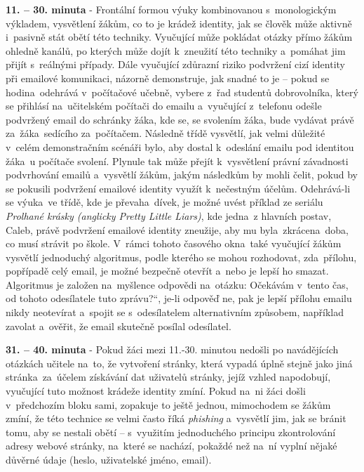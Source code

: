 \documentclass[a4paper, 12pt]{article}
\providecommand{\uv}[1]{\quotedblbase #1\textquotedblleft}
\begin{document}
\textbf{11. -- 30. minuta} - Frontální formou výuky kombinovanou s~monologickým výkladem, vysvětlení žákům, co to je krádež identity, jak se člověk může aktivně i~pasivně stát obětí této techniky. Vyučující může pokládat otázky přímo žákům ohledně kanálů, po kterých může dojít k~zneužití této techniky a~pomáhat jim přijít s~reálnými případy. Dále vyučující zdůrazní riziko podvržení cizí identity při emailové komunikaci, názorně demonstruje, jak snadné to je -- pokud se hodina~odehrává v~počítačové učebně, vybere z~řad studentů dobrovolníka, který se přihlásí na~učitelském počítači do emailu a~vyučující z~telefonu odešle podvržený email do schránky žáka, kde se, se svolením žáka, bude vydávat právě za~žáka~sedícího za~počítačem. Následně třídě vysvětlí, jak velmi důležité v~celém demonstračním scénáři bylo, aby dostal k~odeslání emailu pod identitou žáka~u počítače svolení. Plynule tak může přejít k~vysvětlení právní závadnosti podvrhování emailů a~vysvětlí žákům, jakým následkům by mohli čelit, pokud by se pokusili podvržení emailové identity využít k~nečestným účelům. Odehrává-li se výuka~ve třídě, kde je převaha~dívek, je možné uvést příklad ze seriálu \textit{Prolhané krásky (anglicky Pretty Little Liars)}, kde jedna~z hlavních postav, Caleb, právě podvržení emailové identity zneužije, aby mu byla~zkrácena~doba, co musí strávit po škole. V~rámci tohoto časového okna~také vyučující žákům vysvětlí jednoduchý algoritmus, podle kterého se mohou rozhodovat, zda~přílohu, popřípadě celý email, je možné bezpečně otevřít a~nebo je lepší ho smazat. Algoritmus je založen na~myšlence odpovědi na~otázku: \uv{Očekávám v~tento čas, od tohoto odesílatele tuto zprávu?}, je-li odpověď ne, pak je lepší přílohu emailu nikdy neotevírat a~spojit se s~odesílatelem alternativním způsobem, například zavolat a~ověřit, že email skutečně posílal odesílatel.

\textbf{31. -- 40. minuta} - Pokud žáci mezi 11.-30. minutou nedošli po navádějících otázkách učitele na~to, že vytvoření stránky, která vypadá úplně stejně jako jiná stránka~za~účelem získávání dat uživatelů stránky, jejíž vzhled napodobují, vyučující tuto možnost krádeže identity zmíní. Pokud na~ni žáci došli v~předchozím bloku sami, zopakuje to ještě jednou, mimochodem se žákům zmíní, že této technice se velmi často říká \textit{phishing} a~vysvětlí jim, jak se bránit tomu, aby se nestali obětí -- s~využitím jednoduchého principu zkontrolování adresy webové stránky, na~které se nachází, pokaždé než na~ní vyplní nějaké důvěrné údaje (heslo, uživatelské jméno, email).
\end{document}
